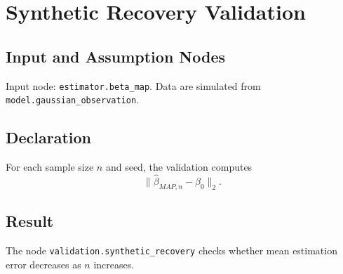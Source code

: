\section{Synthetic Recovery Validation}
\label{validation:synthetic-recovery}

\subsection{Input and Assumption Nodes}
Input node: \texttt{estimator.beta\_map}. Data are simulated from \texttt{model.gaussian\_observation}.

\subsection{Declaration}
For each sample size \(n\) and seed, the validation computes
\[
  \|\hat{\beta}_{MAP,n}-\beta_0\|_2.
\]

\subsection{Result}
The node \texttt{validation.synthetic\_recovery} checks whether mean estimation error decreases as \(n\) increases.

